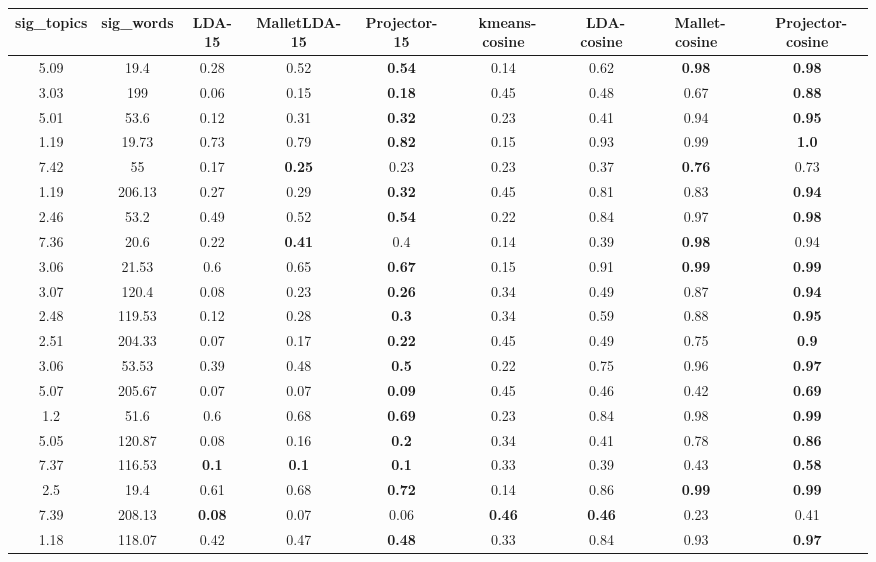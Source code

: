 \begin{table}

{\small
\begin{tabular}{|c|c|c|c|c|c|c|c|c|}
\hline 
sig\_topics &sig\_words &LDA-15 &MalletLDA-15 &Projector-15 &~kmeans-cosine &~LDA-cosine &~Mallet-cosine &~Projector-cosine \\
 \hline 
5.09  &19.4  &0.28  &0.52  &\textbf{0.54}
  &0.14  &0.62  &\textbf{0.98}  &\textbf{0.98}  \\
 \hline 
3.03  &199  &0.06  &0.15  &\textbf{0.18}
  &0.45  &0.48  &0.67  &\textbf{0.88}  \\
 \hline 
5.01  &53.6  &0.12  &0.31  &\textbf{0.32}
  &0.23  &0.41  &0.94  &\textbf{0.95}  \\
 \hline 
1.19  &19.73  &0.73  &0.79  &\textbf{0.82}
  &0.15  &0.93  &0.99  &\textbf{1.0}  \\
 \hline 
7.42  &55  &0.17  &\textbf{0.25}
  &0.23  &0.23  &0.37  &\textbf{0.76}  &0.73  \\
 \hline 
1.19  &206.13  &0.27  &0.29  &\textbf{0.32}
  &0.45  &0.81  &0.83  &\textbf{0.94}  \\
 \hline 
2.46  &53.2  &0.49  &0.52  &\textbf{0.54}
  &0.22  &0.84  &0.97  &\textbf{0.98}  \\
 \hline 
7.36  &20.6  &0.22  &\textbf{0.41}
  &0.4  &0.14  &0.39  &\textbf{0.98}  &0.94  \\
 \hline 
3.06  &21.53  &0.6  &0.65  &\textbf{0.67}
  &0.15  &0.91  &\textbf{0.99}  &\textbf{0.99}  \\
 \hline 
3.07  &120.4  &0.08  &0.23  &\textbf{0.26}
  &0.34  &0.49  &0.87  &\textbf{0.94}  \\
 \hline 
2.48  &119.53  &0.12  &0.28  &\textbf{0.3}
  &0.34  &0.59  &0.88  &\textbf{0.95}  \\
 \hline 
2.51  &204.33  &0.07  &0.17  &\textbf{0.22}
  &0.45  &0.49  &0.75  &\textbf{0.9}  \\
 \hline 
3.06  &53.53  &0.39  &0.48  &\textbf{0.5}
  &0.22  &0.75  &0.96  &\textbf{0.97}  \\
 \hline 
5.07  &205.67  &0.07  &0.07  &\textbf{0.09}
  &0.45  &0.46  &0.42  &\textbf{0.69}  \\
 \hline 
1.2  &51.6  &0.6  &0.68  &\textbf{0.69}
  &0.23  &0.84  &0.98  &\textbf{0.99}  \\
 \hline 
5.05  &120.87  &0.08  &0.16  &\textbf{0.2}
  &0.34  &0.41  &0.78  &\textbf{0.86}  \\
 \hline 
7.37  &116.53  &\textbf{0.1}
  &\textbf{0.1}
  &\textbf{0.1}
  &0.33  &0.39  &0.43  &\textbf{0.58}  \\
 \hline 
2.5  &19.4  &0.61  &0.68  &\textbf{0.72}
  &0.14  &0.86  &\textbf{0.99}  &\textbf{0.99}  \\
 \hline 
7.39  &208.13  &\textbf{0.08}
  &0.07  &0.06  &\textbf{0.46}  &\textbf{0.46}  &0.23  &0.41  \\
 \hline 
1.18  &118.07  &0.42  &0.47  &\textbf{0.48}
  &0.33  &0.84  &0.93  &\textbf{0.97}  \\
 \hline 


\end{tabular}}
\end{table}

